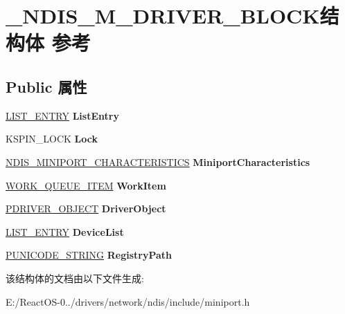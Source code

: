 \hypertarget{struct___n_d_i_s___m___d_r_i_v_e_r___b_l_o_c_k}{}\section{\+\_\+\+N\+D\+I\+S\+\_\+\+M\+\_\+\+D\+R\+I\+V\+E\+R\+\_\+\+B\+L\+O\+C\+K结构体 参考}
\label{struct___n_d_i_s___m___d_r_i_v_e_r___b_l_o_c_k}
\subsection*{Public 属性}
\begin{DoxyCompactItemize}
\item 
\mbox{\label{struct___n_d_i_s___m___d_r_i_v_e_r___b_l_o_c_k_a8fddd7a698cb2648956fb851a5b1e2ba}} 
\hyperlink{struct___l_i_s_t___e_n_t_r_y}{L\+I\+S\+T\+\_\+\+E\+N\+T\+RY} {\bfseries List\+Entry}
\item 
\mbox{\label{struct___n_d_i_s___m___d_r_i_v_e_r___b_l_o_c_k_af7741775c56a84dc6ec780a2bd9d952f}} 
K\+S\+P\+I\+N\+\_\+\+L\+O\+CK {\bfseries Lock}
\item 
\mbox{\label{struct___n_d_i_s___m___d_r_i_v_e_r___b_l_o_c_k_a1839afec1814804105d8042b5176d430}} 
\hyperlink{struct___n_d_i_s___m_i_n_i_p_o_r_t___c_h_a_r_a_c_t_e_r_i_s_t_i_c_s}{N\+D\+I\+S\+\_\+\+M\+I\+N\+I\+P\+O\+R\+T\+\_\+\+C\+H\+A\+R\+A\+C\+T\+E\+R\+I\+S\+T\+I\+CS} {\bfseries Miniport\+Characteristics}
\item 
\mbox{\label{struct___n_d_i_s___m___d_r_i_v_e_r___b_l_o_c_k_a70ac811e6c38a7c12bb89461399ae75f}} 
\hyperlink{struct___w_o_r_k___q_u_e_u_e___i_t_e_m}{W\+O\+R\+K\+\_\+\+Q\+U\+E\+U\+E\+\_\+\+I\+T\+EM} {\bfseries Work\+Item}
\item 
\mbox{\label{struct___n_d_i_s___m___d_r_i_v_e_r___b_l_o_c_k_ae6a18ff627325b2a9b9844d7494b4728}} 
\hyperlink{struct___d_r_i_v_e_r___o_b_j_e_c_t}{P\+D\+R\+I\+V\+E\+R\+\_\+\+O\+B\+J\+E\+CT} {\bfseries Driver\+Object}
\item 
\mbox{\label{struct___n_d_i_s___m___d_r_i_v_e_r___b_l_o_c_k_a27f074a1640cf0a46ccdcf97fd3f2798}} 
\hyperlink{struct___l_i_s_t___e_n_t_r_y}{L\+I\+S\+T\+\_\+\+E\+N\+T\+RY} {\bfseries Device\+List}
\item 
\mbox{\label{struct___n_d_i_s___m___d_r_i_v_e_r___b_l_o_c_k_ae1bd014cf7fa4b2f7edd8f848fb0ebc0}} 
\hyperlink{struct___u_n_i_c_o_d_e___s_t_r_i_n_g}{P\+U\+N\+I\+C\+O\+D\+E\+\_\+\+S\+T\+R\+I\+NG} {\bfseries Registry\+Path}
\end{DoxyCompactItemize}


该结构体的文档由以下文件生成\+:\begin{DoxyCompactItemize}
\item 
E\+:/\+React\+O\+S-\/0../drivers/network/ndis/include/miniport.\+h\end{DoxyCompactItemize}
